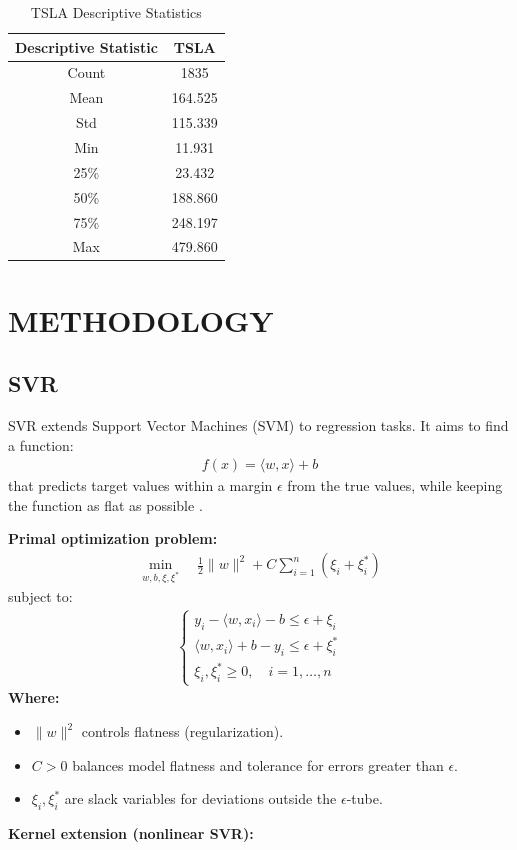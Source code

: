 \documentclass[12pt]{article}
\begin{document}
\begin{table}[H]
    \centering
    \caption{TSLA Descriptive Statistics}
    \label{tab:tsla-stats}
        \begin{tabular}{|c|c|}
        \hline
        \textbf{Descriptive Statistic} & \textbf{TSLA} \\
        \hline
        Count  & 1835 \\
        \hline
        Mean   & 164.525 \\
        \hline
        Std    & 115.339 \\
        \hline
        Min    & 11.931 \\
        \hline
        25\%   & 23.432 \\
        \hline
        50\%   & 188.860 \\
        \hline
        75\%   & 248.197 \\
        \hline
        Max    & 479.860 \\
        \hline
    \end{tabular}
\end{table}

\section{METHODOLOGY}
\subsection{SVR}
SVR extends Support Vector Machines (SVM) to regression tasks. It aims to find a function:
\begin{align}
    f(x) = \langle w, x \rangle + b
\end{align}
that predicts target values within a margin \(\epsilon\) from the true values, while keeping the function as flat as possible \cite{basak2007support}.

\textbf{Primal optimization problem:}
\begin{align}
    \min_{w,b,\xi,\xi^*} \quad \frac{1}{2} \|w\|^2 + C \sum_{i=1}^n (\xi_i + \xi_i^*)
\end{align}
subject to:
\begin{align}
    \begin{cases}
        y_i - \langle w, x_i \rangle - b \leq \epsilon + \xi_i \\
        \langle w, x_i \rangle + b - y_i \leq \epsilon + \xi_i^* \\
        \xi_i, \xi_i^* \geq 0, \quad i=1, \ldots, n
    \end{cases}
\end{align}
\textbf{Where:}
\begin{itemize}
    \item \(\|w\|^2\) controls flatness (regularization).
    \item \(C > 0\) balances model flatness and tolerance for errors greater than \(\epsilon\).
    \item \(\xi_i, \xi_i^*\) are slack variables for deviations outside the \(\epsilon\)-tube.
\end{itemize}
\textbf{Kernel extension (nonlinear SVR):}
\end{document}
